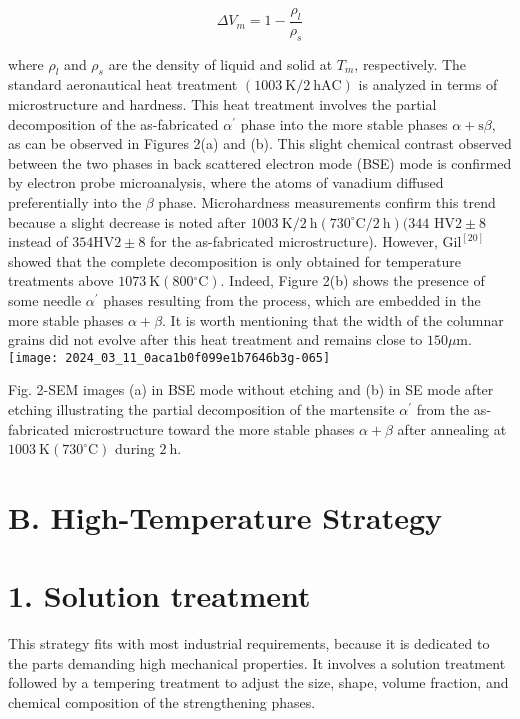 \documentclass[10pt]{article}
\begin{document}
\begin{equation*}
\Delta V_{m}=1-\frac{\rho_{l}}{\rho_{s}} \tag{1}
\end{equation*}


where $\rho_{l}$ and $\rho_{s}$ are the density of liquid and solid at $T_{m}$, respectively. The standard aeronautical heat treatment $(1003 \mathrm{~K} / 2 \mathrm{~h} \mathrm{AC})$ is analyzed in terms of microstructure and hardness. This heat treatment involves the partial decomposition of the as-fabricated $\alpha^{\prime}$ phase into the more stable phases $\alpha+\mathrm{s} \beta$, as can be observed in Figures 2(a) and (b). This slight chemical contrast observed between the two phases in back scattered electron mode (BSE) mode is confirmed by electron probe microanalysis, where the atoms of vanadium diffused preferentially into the $\beta$ phase. Microhardness measurements confirm this trend because a slight decrease is noted after $1003 \mathrm{~K} / 2 \mathrm{~h}\left(730^{\circ} \mathrm{C} / 2 \mathrm{~h}\right)(344$ $\mathrm{HV} 2 \pm 8$ instead of $354 \mathrm{HV} 2 \pm 8$ for the as-fabricated microstructure). However, $\mathrm{Gil}^{[20]}$ showed that the complete decomposition is only obtained for temperature treatments above $1073 \mathrm{~K}\left(800{ }^{\circ} \mathrm{C}\right)$. Indeed, Figure 2(b) shows the presence of some needle $\alpha^{\prime}$ phases resulting from the process, which are embedded in the more stable phases $\alpha+\beta$. It is worth mentioning that the width of the columnar grains did not evolve after this heat treatment and remains close to $150 \mu \mathrm{m}$.\\
\texttt{[image: 2024\_03\_11\_0aca1b0f099e1b7646b3g-065]}

Fig. 2-SEM images (a) in BSE mode without etching and (b) in SE mode after etching illustrating the partial decomposition of the martensite $\alpha^{\prime}$ from the as-fabricated microstructure toward the more stable phases $\alpha+\beta$ after annealing at $1003 \mathrm{~K}\left(730^{\circ} \mathrm{C}\right)$ during $2 \mathrm{~h}$.

\section*{B. High-Temperature Strategy}
\section*{1. Solution treatment}
This strategy fits with most industrial requirements, because it is dedicated to the parts demanding high mechanical properties. It involves a solution treatment followed by a tempering treatment to adjust the size, shape, volume fraction, and chemical composition of the strengthening phases.
\end{document}

